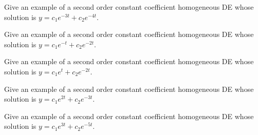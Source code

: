 \ifnum {}
\question[1] Give an example of a second order constant coefficient homogeneous DE whose solution is $y = c_1e^{-3t} + c_2e^{-4t}$. \vspace{2cm}
\fi 

\ifnum {}
\question[1] Give an example of a second order constant coefficient homogeneous DE whose solution is $y = c_1e^{-t} + c_2e^{-2t}$. \vspace{2cm}
\fi

\ifnum {}
\question[1] Give an example of a second order constant coefficient homogeneous DE whose solution is $y = c_1e^{t} + c_2e^{-2t}$. \vspace{2cm}
\fi 

\ifnum {}
\question[1] Give an example of a second order constant coefficient homogeneous DE whose solution is $y = c_1e^{2t} + c_2e^{-3t}$. \vspace{2cm}
\fi 

\ifnum {}
\question[1] Give an example of a second order constant coefficient homogeneous DE whose solution is $y = c_1e^{3t} + c_2e^{-5t}$. \vspace{2cm}
\fi 




